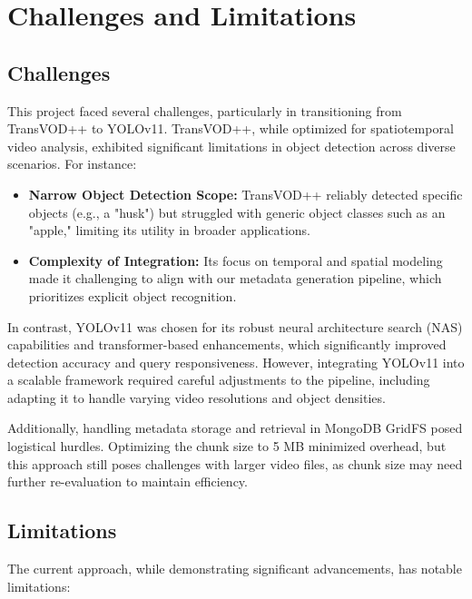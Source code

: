 \documentclass[conference]{IEEEtran}
\begin{document}
\section{Challenges and Limitations}
\label{sec:challenges}

\subsection{Challenges}
\label{sec:challenges-sub}

This project faced several challenges, particularly in transitioning from TransVOD++ to YOLOv11. TransVOD++, while optimized for spatiotemporal video analysis, exhibited significant limitations in object detection across diverse scenarios. For instance:
\begin{itemize}
    \item \textbf{Narrow Object Detection Scope:} TransVOD++ reliably detected specific objects (e.g., a "husk") but struggled with generic object classes such as an "apple," limiting its utility in broader applications.
    \item \textbf{Complexity of Integration:} Its focus on temporal and spatial modeling made it challenging to align with our metadata generation pipeline, which prioritizes explicit object recognition.
\end{itemize}

In contrast, YOLOv11 was chosen for its robust neural architecture search (NAS) capabilities and transformer-based enhancements, which significantly improved detection accuracy and query responsiveness. However, integrating YOLOv11 into a scalable framework required careful adjustments to the pipeline, including adapting it to handle varying video resolutions and object densities.

Additionally, handling metadata storage and retrieval in MongoDB GridFS posed logistical hurdles. Optimizing the chunk size to 5 MB minimized overhead, but this approach still poses challenges with larger video files, as chunk size may need further re-evaluation to maintain efficiency.


\subsection{Limitations}
\label{sec:limitations}

The current approach, while demonstrating significant advancements, has notable limitations:
\end{document}
